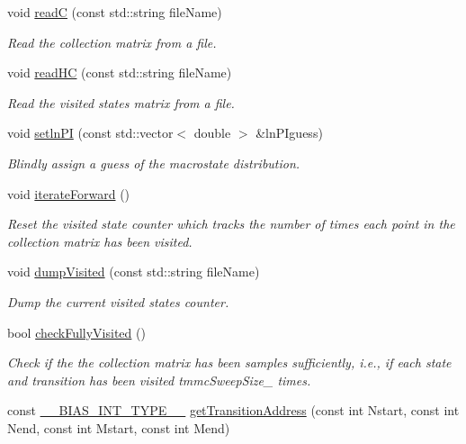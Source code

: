 \begin{DoxyCompactItemize}
void \hyperlink{classtmmc_a7d9ee0505dc801cbff55bc35c3654a61}{read\-C} (const std\-::string file\-Name)
\begin{DoxyCompactList}\small\item\em Read the collection matrix from a file. \end{DoxyCompactList}\item 
void \hyperlink{classtmmc_ab51a593d041a65c4ca47e6c4e0c26992}{read\-H\-C} (const std\-::string file\-Name)
\begin{DoxyCompactList}\small\item\em Read the visited states matrix from a file. \end{DoxyCompactList}\item 
void \hyperlink{classtmmc_a416db4e54e3d2ab23daed2e33468df4d}{setln\-P\-I} (const std\-::vector$<$ double $>$ \&ln\-P\-Iguess)
\begin{DoxyCompactList}\small\item\em Blindly assign a guess of the macrostate distribution. \end{DoxyCompactList}\item 
void \hyperlink{classtmmc_a611b5a86b3887afd9e90e2e4da66de35}{iterate\-Forward} ()
\begin{DoxyCompactList}\small\item\em Reset the visited state counter which tracks the number of times each point in the collection matrix has been visited. \end{DoxyCompactList}\item 
void \hyperlink{classtmmc_a295886d2f7a947a9de890bcb3adb51c7}{dump\-Visited} (const std\-::string file\-Name)
\begin{DoxyCompactList}\small\item\em Dump the current visited states counter. \end{DoxyCompactList}\item 
bool \hyperlink{classtmmc_aa51f03f958dabefcff97be4a7c3b336c}{check\-Fully\-Visited} ()
\begin{DoxyCompactList}\small\item\em Check if the the collection matrix has been samples sufficiently, i.\-e., if each state and transition has been visited tmmc\-Sweep\-Size\-\_\- times. \end{DoxyCompactList}\item 
const \hyperlink{bias_8h_a1ceb524363fcb94da0c64d297ea27438}{\-\_\-\-\_\-\-B\-I\-A\-S\-\_\-\-I\-N\-T\-\_\-\-T\-Y\-P\-E\-\_\-\-\_\-} \hyperlink{classtmmc_ae296df3336ebf0fa1db7c34972c544eb}{get\-Transition\-Address} (const int Nstart, const int Nend, const int Mstart, const int Mend)

\end{DoxyCompactItemize}
